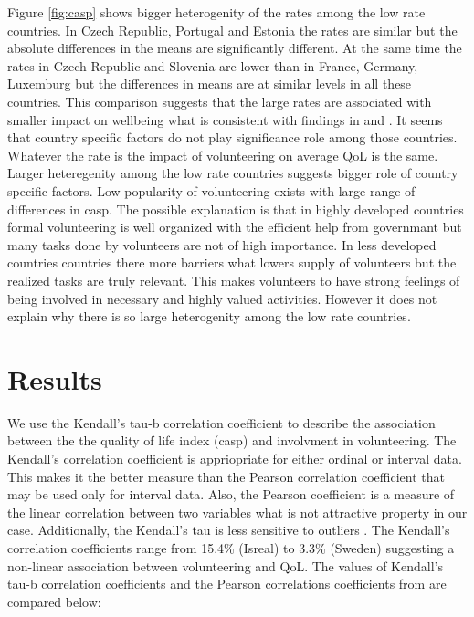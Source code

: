 \documentclass[10pt, letterpaper]{article}
\begin{document}
\begin{spacing}{1.4}
Figure \ref{fig:casp} shows bigger heterogenity of the rates among the low rate countries. In Czech Republic, Portugal and Estonia the rates are similar but the absolute differences in the means are significantly different. At the same time the rates in Czech Republic and Slovenia are lower than in France, Germany, Luxemburg but the differences in means are at similar levels in all these countries. This comparison suggests that the large rates are associated with smaller impact on wellbeing what is consistent with findings in \citet{haski09} and \citet{plagnol10}. It seems that country specific factors do not play significance role among those countries. Whatever the rate is the impact of volunteering on average QoL is the same. Larger heteregenity  among the low rate countries suggests bigger role of country specific factors. Low popularity of volunteering exists with large range of differences in casp. The possible explanation is that in highly developed countries formal volunteering is well organized with the efficient help from governmant but many tasks done by volunteers are not of high importance. In less developed countries countries there more barriers what lowers supply of volunteers but the realized tasks are truly relevant. This makes volunteers to have strong feelings of being involved in necessary and highly valued activities. However it does not explain why there is so large heterogenity among the low rate countries.   



\section{Results}

We use the Kendall's tau-b correlation coefficient to describe the association between the the quality of life index (casp) and involvment in volunteering. The Kendall's correlation coefficient is appriopriate for either ordinal or interval data. This makes it the better measure than the Pearson correlation coefficient that may be used only for interval data.  Also, the Pearson coefficient is a measure of the linear correlation between two variables what is not attractive property in our case. Additionally, the Kendall's tau is less sensitive to outliers  \citet{khamis08}. The Kendall's correlation coefficients range from 15.4\% (Isreal) to 3.3\% (Sweden) suggesting a non-linear association between volunteering and QoL. The values of Kendall's tau-b correlation coefficients and the Pearson correlations coefficients from \citet{haski09} are compared below: 



\end{spacing}
\end{document}
